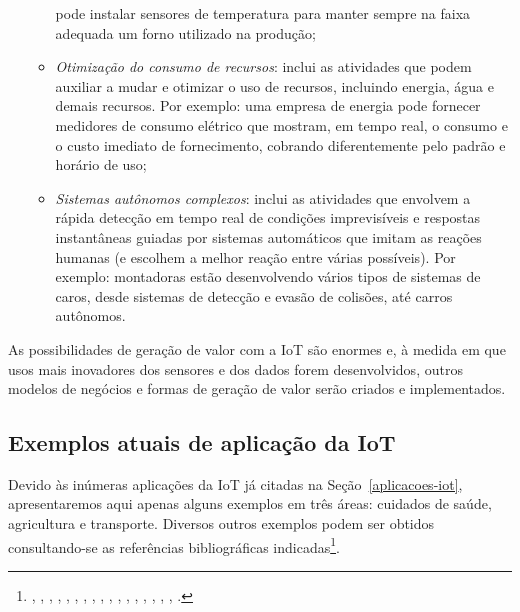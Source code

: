 \documentclass[pdftex, brazil, 12pt, twoside]{article}
\begin{document}
\begin{itemize}
\begin{itemize}
    pode instalar sensores de temperatura para manter sempre na faixa adequada
    um forno utilizado na produção;
  \item \emph{Otimização do consumo de recursos}: inclui as atividades que podem
    auxiliar a mudar e otimizar o uso de recursos, incluindo energia, água e
    demais recursos. Por exemplo: uma empresa de energia pode fornecer medidores
    de consumo elétrico que mostram, em tempo real, o consumo e o custo imediato
    de fornecimento, cobrando diferentemente pelo padrão e horário de uso;
  \item \emph{Sistemas autônomos complexos}: inclui as atividades que envolvem
    a rápida detecção em tempo real de condições imprevisíveis e respostas
    instantâneas guiadas por sistemas automáticos que imitam as reações humanas
    (e escolhem a melhor reação entre várias possíveis). Por exemplo: montadoras
    estão desenvolvendo vários tipos de sistemas de caros, desde sistemas de
    detecção e evasão de colisões, até carros autônomos.
  \end{itemize}
\end{itemize}

As possibilidades de geração de valor com a IoT são enormes e, à medida
em que usos mais inovadores dos sensores e dos dados forem
desenvolvidos, outros modelos de negócios e formas de geração de valor serão
criados e implementados.


\subsection{Exemplos atuais de aplicação da IoT}
\label{aplicacoes-iot-exemplos}

Devido às inúmeras aplicações da IoT já citadas na Seção~\ref{aplicacoes-iot},
apresentaremos aqui apenas alguns exemplos em três áreas: cuidados de saúde,
agricultura e transporte. Diversos outros exemplos podem ser obtidos consultando-se
as referências bibliográficas indicadas\footnote{\citet{OliverWymanIoT2015},
  \citet{UKGOSWalportIoT2014}, \citet{IEEEIoTReport}, \citet{IEEEIoTDefinition},
  \citet{ChuiIoT2010}, \citet{BughinExecutiveIoT2015}, \citet{GuptaMcKinseyIoT2017},
  \citet{McKinseyIoTHype}, \citet{SAPFutureIoT}, \citet{SASIoTUseCases2016},
  \citet{MorganStanleyIoTnow2013}, \citet{AlaskaIoTComm2015}, \citet{BackDeckerIoT2014},
  \citet{MazakIoT2016}, \citet{CopenhagenIoT2013}, \citet{KansasIoT2016},
  \citet{RockwellIoT2016}, \citet{MississaugaIoT2015}.}.
\end{document}
